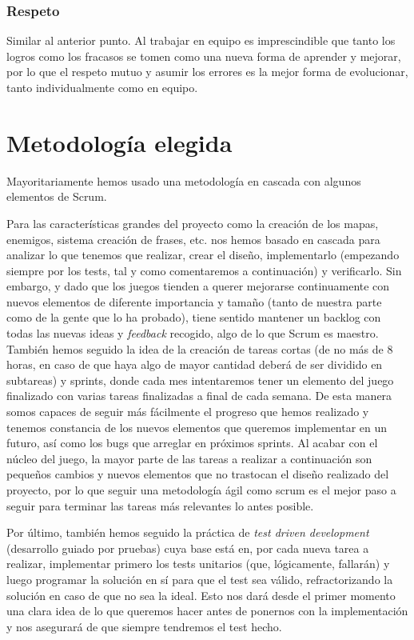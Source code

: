 \subsubsection{Respeto}

Similar al anterior punto. Al trabajar en equipo es imprescindible que tanto los logros como los fracasos se tomen como una nueva forma de aprender y mejorar, por lo que el respeto mutuo y asumir los errores es la mejor forma de evolucionar, tanto individualmente como en equipo.

\section{Metodología elegida}
\label{sec:metodologiaelegida}

Mayoritariamente hemos usado una metodología en cascada con algunos elementos de Scrum.

Para las características grandes del proyecto como la creación de los mapas, enemigos, sistema creación de frases, etc. nos hemos basado en cascada para analizar lo que tenemos que realizar, crear el diseño, implementarlo (empezando siempre por los tests, tal y como comentaremos a continuación) y verificarlo. Sin embargo, y dado que los juegos tienden a querer mejorarse continuamente con nuevos elementos de diferente importancia y tamaño (tanto de nuestra parte como de la gente que lo ha probado), tiene sentido mantener un backlog con todas las nuevas ideas y \textit{feedback} recogido, algo de lo que Scrum es maestro. También hemos seguido la idea de la creación de tareas cortas (de no más de 8 horas, en caso de que haya algo de mayor cantidad deberá de ser dividido en subtareas) y sprints, donde cada mes intentaremos tener un elemento del juego finalizado con varias tareas finalizadas a final de cada semana. De esta manera somos capaces de seguir más fácilmente el progreso que hemos realizado y tenemos constancia de los nuevos elementos que queremos implementar en un futuro, así como los bugs que arreglar en próximos sprints.
Al acabar con el núcleo del juego, la mayor parte de las tareas a realizar a continuación son pequeños cambios y nuevos elementos que no trastocan el diseño realizado del proyecto, por lo que seguir una metodología ágil como scrum es el mejor paso a seguir para terminar las tareas más relevantes lo antes posible.

Por último, también hemos seguido la práctica de \textit{test driven development} (desarrollo guiado por pruebas) cuya base está en, por cada nueva tarea a realizar, implementar primero los tests unitarios (que, lógicamente, fallarán) y luego programar la solución en sí para que el test sea válido, refractorizando la solución en caso de que no sea la ideal. Esto nos dará desde el primer momento una clara idea de lo que queremos hacer antes de ponernos con la implementación y nos asegurará de que siempre tendremos el test hecho.